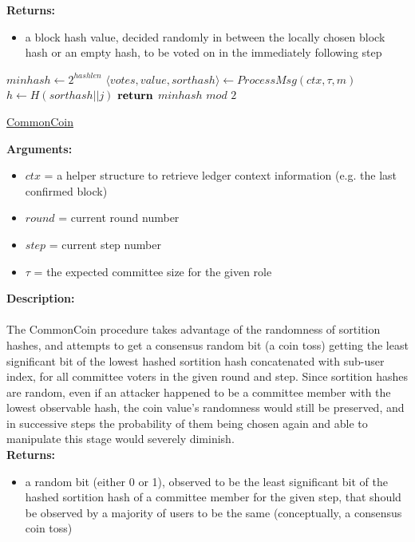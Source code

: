 \documentclass[10pt,a4paper]{article}
\begin{document}
\noindent \textbf{Returns:}
\begin{itemize}
    \item a block hash value, decided randomly in between the locally chosen block hash or an empty hash, to be voted on
    in the immediately following step
  \end{itemize}


\begin{algorithm}
    \begin{algorithmic}[H]

    \State $minhash \gets 2^{hashlen}$
        \State $\langle votes,value,sorthash\rangle \gets ProcessMsg(ctx,\tau,m)$
                \State $h \gets H(sorthash||j)$
        \EndFor
    \EndFor
    $\Return$ $minhash$ $mod$ $2$
    \EndFunction
    \end{algorithmic}
    \caption{\underline{CommonCoin}}
\end{algorithm}


\noindent \textbf{Arguments:}
\begin{itemize}
    \item $ctx$ = a helper structure to retrieve ledger context information (e.g. the last confirmed block)
    \item $round$ = current round number
    \item $step$ = current step number
    \item $\tau$ = the expected committee size for the given role
  \end{itemize}

\noindent \textbf{Description:}\\\\
The CommonCoin procedure takes advantage of the randomness of sortition hashes, and attempts to
get a consensus random bit (a coin toss) getting the least significant bit of the lowest hashed
sortition hash concatenated with sub-user index, for all committee voters in the given round and step.
Since sortition hashes are random, even if an attacker happened to be a committee member with the lowest observable hash,
the coin value's randomness would still be preserved, and in successive steps the probability of them being chosen again and
able to manipulate this stage would severely diminish.\\

\noindent \textbf{Returns:}
\begin{itemize}
    \item a random bit (either 0 or 1), observed to be the least significant bit of the hashed sortition hash of a committee member for the given step,
    that should be observed by a majority of users to be the same (conceptually, a consensus coin toss)
  \end{itemize}
\end{document}
